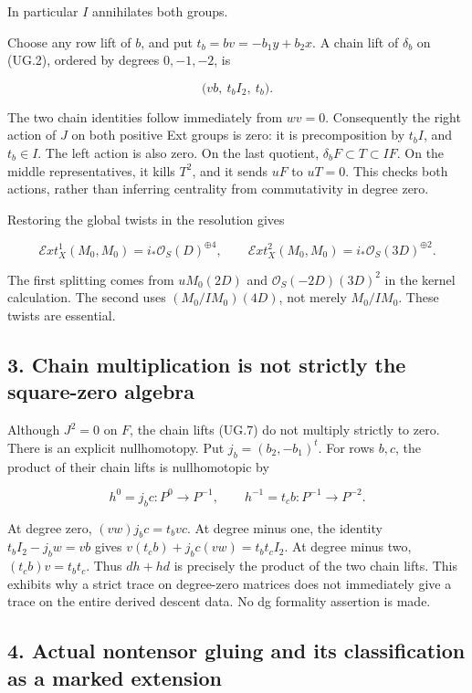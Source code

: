 In particular \(I\) annihilates both groups.

Choose any row lift of \(b\), and put \(t_b=bv=-b_1y+b_2x\). A chain
lift of \(\delta_b\) on (UG.2), ordered by degrees \(0,-1,-2\), is

\[
 \bigl(vb,\ t_b I_2,\ t_b\bigr).
 \tag{UG.7}
\]

The two chain identities follow immediately from \(wv=0\). Consequently
the right action of \(J\) on both positive Ext groups is zero: it is
precomposition by \(t_b I\), and \(t_b\in I\). The left action is also
zero. On the last quotient, \(\delta_bF\subset T\subset IF\). On the
middle representatives, it kills \(T^2\), and it sends \(uF\) to
\(uT=0\). This checks both actions, rather than inferring centrality
from commutativity in degree zero.

Restoring the global twists in the resolution gives

\[
 \mathcal E xt^1_X(M_0,M_0)=i_*\mathcal O_S(D)^{\oplus4},
 \qquad
 \mathcal E xt^2_X(M_0,M_0)=i_*\mathcal O_S(3D)^{\oplus2}.
 \tag{UG.8}
\]

The first splitting comes from \(uM_0(2D)\) and
\(\mathcal O_S(-2D)(3D)^2\) in the kernel calculation. The second uses
\((M_0/IM_0)(4D)\), not merely \(M_0/IM_0\). These twists are essential.

\subsection{3. Chain multiplication is not strictly the square-zero
algebra}\label{SF-UG-chain-multiplication-is-not-strictly-the-square-zero-algebra}

Although \(J^2=0\) on \(F\), the chain lifts (UG.7) do not multiply
strictly to zero. There is an explicit nullhomotopy. Put
\(j_b=(b_2,-b_1)^t\). For rows \(b,c\), the product of their chain lifts
is nullhomotopic by

\[
 h^0=j_b c:P^0\to P^{-1},
 \qquad h^{-1}=t_c b:P^{-1}\to P^{-2}.
 \tag{UG.9}
\]

At degree zero, \((vw)j_bc=t_bvc\). At degree minus one, the identity
\(t_bI_2-j_bw=vb\) gives \(v(t_cb)+j_bc(vw)=t_bt_cI_2\). At degree minus
two, \((t_cb)v=t_bt_c\). Thus \(dh+hd\) is precisely the product of the
two chain lifts. This exhibits why a strict trace on degree-zero
matrices does not immediately give a trace on the entire derived descent
data. No dg formality assertion is made.

\subsection{4. Actual nontensor gluing and its classification as a
marked
extension}\label{SF-UG-actual-nontensor-gluing-and-its-classification-as-a-marked-extension}

